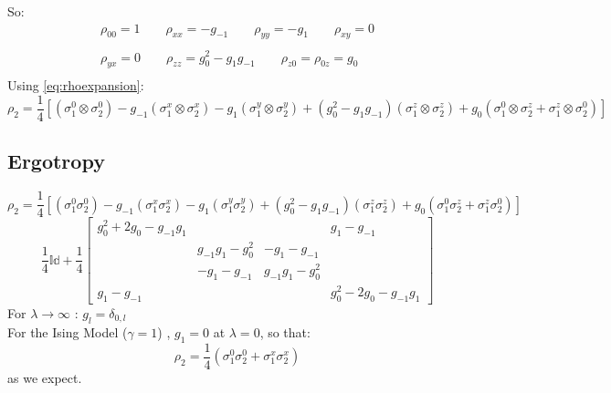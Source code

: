 \documentclass[12pt,a4paper]{book}
\theoremstyle{definition}
\begin{document}
So:
\begin{equation}\label{eq:coeff2sites}
	\begin{gathered}
		\rho_{00}=1 \qquad
		\rho_{xx}=-g_{-1} \qquad \rho_{yy}=-g_1 \qquad \rho_{xy}=0  \\
		\\ \rho_{yx}=0 \qquad
		\rho_{zz}=g_{0}^2-g_1g_{-1} \qquad \rho_{z0}=\rho_{0z}=g_0 \\
	\end{gathered}
\end{equation}
Using \ref{eq:rhoexpansion}:
\begin{equation}
	\rho_2=\frac{1}{4} [ ( \sigma_1^0 \otimes\sigma_2^0 ) -g_{-1} \left(\sigma_1^x \otimes\sigma_2^x\right) - g_{1} \left(\sigma_1^y \otimes\sigma_2^y\right) + (g_{0}^2-g_1g_{-1}) \left(\sigma_1^z \otimes\sigma_2^z\right)+g_0\left(\sigma_1^0 \otimes\sigma_2^z+\sigma_1^z \otimes\sigma_2^0\right) ] 
 \end{equation}

\newpage
\subsection{Ergotropy}
\begin{equation}
	\rho_2=\frac{1}{4}  [ ( \sigma_1^0 \sigma_2^0 ) -g_{-1} \left(\sigma_1^x \sigma_2^x\right) - g_{1} \left(\sigma_1^y \sigma_2^y\right) + (g_{0}^2-g_1g_{-1}) \left(\sigma_1^z \sigma_2^z\right)+g_0\left(\sigma_1^0 \sigma_2^z+\sigma_1^z \sigma_2^0\right) ] 
\end{equation}
\begin{equation}\label{eq:rho2explicit}
	\frac{1}{4}\mathbb{Id} + \frac{1}{4} \left[
	\begin{array}{cccc}
		g_0^2+2g_0-g_{-1} g_1&  &  & g_1-g_{-1} \\
		& g_{-1} g_1-g_0^2 &-g_1-g_{-1}  &  \\
		& -g_1-g_{-1} & g_{-1} g_1-g_0^2 &  \\
		g_1-g_{-1}&  &  &  g_0^2-2g_0-g_{-1} g_1
	\end{array}\right]
\end{equation}
For $\lambda \rightarrow \infty $ : $g_l =\delta_{0,l}$ \\







For the Ising Model ($\gamma=1$) , $g_1=0$ at $\lambda=0$, so that:
\begin{equation} 
	\rho_2=	\frac{1}{4} \left( \sigma_1^0 \sigma_2^0 + \sigma_1^x \sigma_2^x \right)
\end{equation}
as we expect.\\
\end{document}
